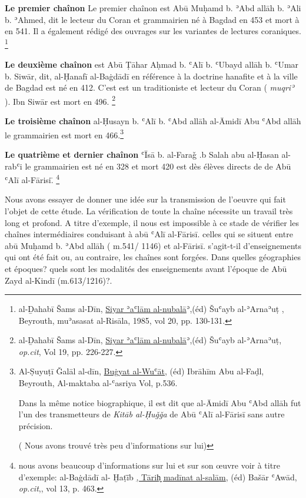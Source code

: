 \documentclass[a4paper,12pt]{report}
\begin{document}
	\textbf{Le premier chaînon}  	Le premier chaînon  est Abū Muḥamd b. ʾAbd allāh b. ʾAli b. ʾAhmed, dit le lecteur du Coran et  grammairien  né à Bagdad en 453  et mort à  en 541.  Il a également rédigé des ouvrages sur les variantes de lectures coraniques. \footnote {al-Ḏahabī Šams al-Dīn, \underline  { Siyar ʾaʿlām al-nubalā}ʾ,(éd) Šuʿayb al-ʾArnaʾuṭ , Beyrouth, muʾasasat al-Risāla, 1985, vol 20,  pp. 130-131. } 

	\textbf{Le deuxième chaînon}
est Abū Ṭāhar Aḥmad b. ʿAlī b. ʿUbayd allāh  b. ʿUmar b. Siwār, dit, al-Ḥanafī al-Baġdādī  en référence à la doctrine hanafite et à la ville de Bagdad  est né en 412.   C'est est un traditioniste et  lecteur du Coran ( \textit{muqriʾ} ).   Ibn Siwār est mort  en 496.   \footnote {al-Ḏahabī Šams al-Dīn, \underline  { Siyar ʾaʿlām al-nubalā}ʾ,(éd) Šuʿayb al-ʾArnaʾuṭ, \textit{op.cit}, Vol 19, pp. 226-227.}


	\textbf{Le troisième chaînon} al-Ḥusayn b. ʿAlī b. ʿAbd allāh al-Āmidī Abu ʿAbd allāh le grammairien est mort en  466.\footnote {Al-Ṣuyuṭī Ǧalāl al-dīn, \underline {Buġyat al-Wuʿāt}, (éd) Ibrāhīm Abu al-Faḍl, Beyrouth, Al-maktaba al-ʿasriya
Vol, p.536. 
 

Dans la même notice biographique, il est dit que al-Āmidī Abu ʿAbd allāh fut l'un des transmetteurs de \textit{Kitāb al-Ḥuǧǧa} de Abū ʿAlī al-Fārisī sans autre précision.

( Nous avons trouvé très peu d'informations sur lui)} 


	\textbf{Le quatrième et dernier chaînon} 
 ʿ\=Is\=a b. al-Faraǧ  .b Salah abu al-Ḥasan al-rabʿi le grammairien est né en 328 et mort 420 est dès élèves directs de de Abū ʿAlī  al-Fārisi.̄   \footnote {nous avons beaucoup d'informations sur lui   et sur son œuvre voir à titre d'exemple:
 al-Baġdādī al- Ḫaṭī̄b \underline{, Tārih̬ madīnat al-salām},  (éd) Bašār ʿAwād, \textit{op.cit},, vol 13, p. 463.  
 }

Nous avons essayer de  donner une idée sur la transmission de l'oeuvre qui fait l'objet de cette étude.  La vérification de toute la chaîne nécessite un travail très long et profond. A titre d'exemple, il nous est impossible à ce stade de vérifier les chaînes intermédiaires conduisant à abū ʿAlī  al-Fāris\=i. celles qui se situent entre abū Muḥamd b. ʾAbd allāh ( m.541/ 1146) et al-Fāris\=i. s'agit-t-il d'enseignements qui ont été fait ou, au contraire, les chaînes sont forgées. 
Dans quelles géographies et époques? quels sont les modalités des enseignements avant l'époque de  Abū Zayd al-Kindī  (m.613/1216)?.
\end{document}
